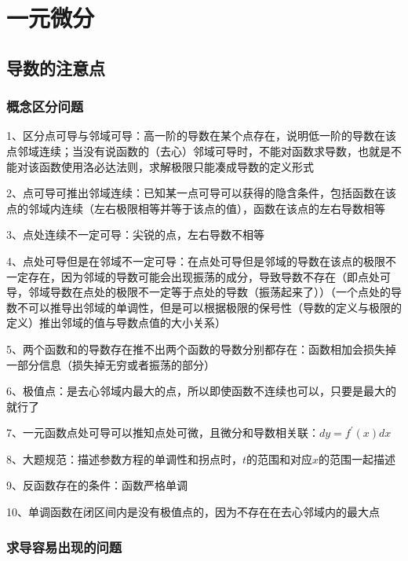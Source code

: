 \chapter{一元微分}

\section{导数的注意点}



\subsection{概念区分问题}

1、区分点可导与邻域可导：高一阶的导数在某个点存在，说明低一阶的导数在该点邻域连续；当没有说函数的（去心）邻域可导时，不能对函数求导数，也就是不能对该函数使用洛必达法则，求解极限只能凑成导数的定义形式

2、点可导可推出邻域连续：已知某一点可导可以获得的隐含条件，包括函数在该点的邻域内连续（左右极限相等并等于该点的值），函数在该点的左右导数相等

3、点处连续不一定可导：尖锐的点，左右导数不相等

4、点处可导但是在邻域不一定可导：在点处可导但是邻域的导数在该点的极限不一定存在，因为邻域的导数可能会出现振荡的成分，导致导数不存在（即点处可导，邻域导数在点处的极限不一定等于点处的导数（振荡起来了））（一个点处的导数不可以推导出邻域的单调性，但是可以根据极限的保号性（导数的定义与极限的定义）推出邻域的值与导数点值的大小关系）

5、两个函数和的导数存在推不出两个函数的导数分别都存在：函数相加会损失掉一部分信息（损失掉无穷或者振荡的部分）

6、极值点：是去心邻域内最大的点，所以即使函数不连续也可以，只要是最大的就行了

7、一元函数点处可导可以推知点处可微，且微分和导数相关联：$dy=f^{\prime}(x)dx$

8、大题规范：描述参数方程的单调性和拐点时，$t$的范围和对应$x$的范围一起描述

9、反函数存在的条件：函数严格单调

10、单调函数在闭区间内是没有极值点的，因为不存在在去心邻域内的最大点



\subsection{求导容易出现的问题}

